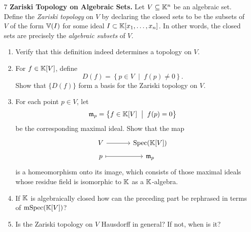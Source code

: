 \documentclass[Notebook.tex]{subfiles}
\begin{document}
\newpage 

\begin{problem}{7}
    \textbf{Zariski Topology on Algebraic Sets.} Let $V \subseteq \mathbb K^n$ be an algebraic set. Define the \emph{Zariski topology} on $V$ by declaring the closed sets to be the subsets of $V$ of the form $\mathbb V(I)$ for some ideal $I \subset \mathbb K[x_1,\ldots,x_n]$. In other words, the closed sets are precisely the \emph{algebraic subsets} of $V$.
    \begin{enumerate}[label=(\alph*),ref=\theenumi\alph*]
        \item Verify that this definition indeed determines a topology on $V$.

        \item For $f \in \mathbb K[V]$, define
        \[
        D(f) = \left\{p \in V \;\; \big| \;\;  f(p) \neq 0\right \}.
        \]
        Show that $\{D(f)\}$ form a basis for the Zariski topology on $V$.

        \item For each point $p \in V$, let
        \[
        \operatorname{\mathfrak{m}}_p = \left\{f \in \mathbb K[V] \;\; \big| \;\;  f(p)=0 \right\}
        \]
        be the corresponding maximal ideal. Show that the map
        \[
        \begin{tikzcd}[row sep = .5em, column sep = 3.5em]
        V \arrow[r] & \Spec(\K[V]) \\
        p \arrow[r,mapsto] & \fm_p
        \end{tikzcd}
        \]
        is a homeomorphism onto its image, which consists of those maximal ideals whose residue field is isomorphic to $\mathbb K$ as a $\mathbb K$-algebra.
        \item If $\mathbb K$ is algebraically closed how can the preceding part be rephrased in terms of $\operatorname{mSpec}(\mathbb K[V])$?
        \item Is the Zariski topology on $V$ Hausdorff in general? If not, when is it? 
    \end{enumerate}
\end{problem}
\end{document}
